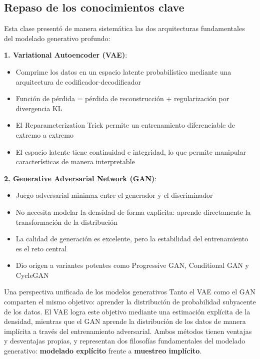 \documentclass[a4paper]{article}
\begin{document}
\subsection{Repaso de los conocimientos clave}

Esta clase presentó de manera sistemática las dos arquitecturas fundamentales del modelado generativo profundo:

\textbf{1. Variational Autoencoder (VAE)}:
\begin{itemize}
    \item Comprime los datos en un espacio latente probabilístico mediante una arquitectura de codificador-decodificador
    \item Función de pérdida = pérdida de reconstrucción + regularización por divergencia KL
    \item El Reparameterization Trick permite un entrenamiento diferenciable de extremo a extremo
    \item El espacio latente tiene continuidad e integridad, lo que permite manipular características de manera interpretable
\end{itemize}

\textbf{2. Generative Adversarial Network (GAN)}:
\begin{itemize}
    \item Juego adversarial minimax entre el generador y el discriminador
    \item No necesita modelar la densidad de forma explícita: aprende directamente la transformación de la distribución
    \item La calidad de generación es excelente, pero la estabilidad del entrenamiento es el reto central
    \item Dio origen a variantes potentes como Progressive GAN, Conditional GAN y CycleGAN
\end{itemize}

\begin{importantbox}{Una perspectiva unificada de los modelos generativos}
Tanto el VAE como el GAN comparten el mismo objetivo: aprender la distribución de probabilidad subyacente de los datos. El VAE logra este objetivo mediante una estimación explícita de la densidad, mientras que el GAN aprende la distribución de los datos de manera implícita a través del entrenamiento adversarial. Ambos métodos tienen ventajas y desventajas propias, y representan dos filosofías fundamentales del modelado generativo: \textbf{modelado explícito} frente a \textbf{muestreo implícito}.
\end{importantbox}
\end{document}
